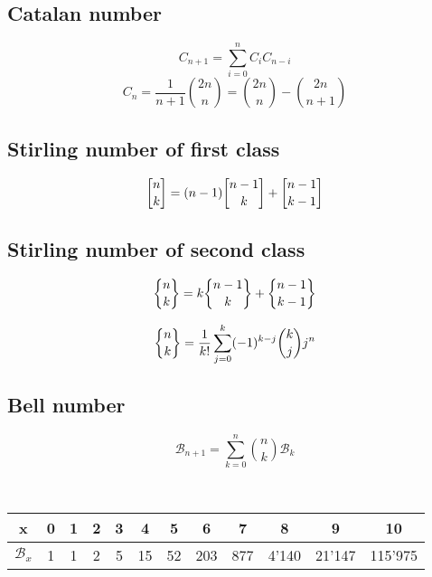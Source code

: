 	\subsection{Catalan number}
	\begin{equation*}
	C_{n+1} = \sum_{i=0}^nC_iC_{n-i}
	\end{equation*}
	\begin{equation*}
	C_n = \frac{1}{n+1}\binom{2n}{n} = \binom{2n}{n} - \binom{2n}{n+1}
	\end{equation*}
	
	\subsection{Stirling number of first class}
	\begin{equation*}
	\stirlingfirst{n}{k} = (n-1)\stirlingfirst{n-1}{k} + \stirlingfirst{n-1}{k-1}
	\end{equation*}
	
	\subsection{Stirling number of second class}
	\begin{equation*}
	\stirlingsecond{n}{k} = k\stirlingsecond{n-1}{k} + \stirlingsecond{n-1}{k-1}
	\end{equation*}
	
	\begin{equation*}
	\stirlingsecond{n}{k} = \frac{1}{k!}\sum_{j=0}^k (-1)^{k-j} \binom{k}{j} j^n
	\end{equation*}
	
	\subsection{Bell number}
	
	\begin{equation*}
	\mathcal{B}_{n+1} = \sum_{k=0}^n \binom{n}{k} \mathcal{B}_k
	\end{equation*}
	
	\
	
	\begin{tabular}{|c|c|c|c|c|c|c|c|c|c|c|c|}
	    	\hline
	    	x&0&1&2&3&4&5&6&7&8&9&10 \\ \hline %
	    	$\mathcal{B}_x$&1&1&2&5&15&52&203&877&4'140&21'147&115'975 \\ \hline %
	\end{tabular}
	
